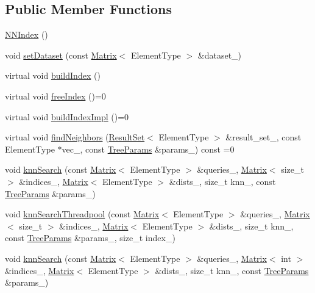 \subsection*{Public Member Functions}
\begin{DoxyCompactItemize}
\item 
\hyperlink{classtrees_1_1_n_n_index_ae314d8a7c8c0db0eaf22b667b4b4a14e}{N\+N\+Index} ()
\item 
void \hyperlink{classtrees_1_1_n_n_index_a0f02fa0888a3c93b38465ccd37517ba1}{set\+Dataset} (const \hyperlink{classtrees_1_1_matrix}{Matrix}$<$ Element\+Type $>$ \&dataset\+\_\+)
\item 
virtual void \hyperlink{classtrees_1_1_n_n_index_ad8db1182322eba8c1f68ce250e45a36c}{build\+Index} ()
\item 
virtual void \hyperlink{classtrees_1_1_n_n_index_afc6b99a8f2693e8b446fc6697dac9f0d}{free\+Index} ()=0
\item 
virtual void \hyperlink{classtrees_1_1_n_n_index_a3a280e25b04449f34c4ed0fcc419e7b1}{build\+Index\+Impl} ()=0
\item 
virtual void \hyperlink{classtrees_1_1_n_n_index_af48da46453e78744d8874c529e06b5ff}{find\+Neighbors} (\hyperlink{classtrees_1_1_result_set}{Result\+Set}$<$ Element\+Type $>$ \&result\+\_\+set\+\_\+, const Element\+Type $\ast$vec\+\_\+, const \hyperlink{structtrees_1_1_tree_params}{Tree\+Params} \&params\+\_\+) const =0
\item 
void \hyperlink{classtrees_1_1_n_n_index_abf4572754ebd83300ab7c7747be10752}{knn\+Search} (const \hyperlink{classtrees_1_1_matrix}{Matrix}$<$ Element\+Type $>$ \&queries\+\_\+, \hyperlink{classtrees_1_1_matrix}{Matrix}$<$ size\+\_\+t $>$ \&indices\+\_\+, \hyperlink{classtrees_1_1_matrix}{Matrix}$<$ Element\+Type $>$ \&dists\+\_\+, size\+\_\+t knn\+\_\+, const \hyperlink{structtrees_1_1_tree_params}{Tree\+Params} \&params\+\_\+)
\item 
void \hyperlink{classtrees_1_1_n_n_index_a059a92d41b77db12a7803e8348ae1c11}{knn\+Search\+Threadpool} (const \hyperlink{classtrees_1_1_matrix}{Matrix}$<$ Element\+Type $>$ \&queries\+\_\+, \hyperlink{classtrees_1_1_matrix}{Matrix}$<$ size\+\_\+t $>$ \&indices\+\_\+, \hyperlink{classtrees_1_1_matrix}{Matrix}$<$ Element\+Type $>$ \&dists\+\_\+, size\+\_\+t knn\+\_\+, const \hyperlink{structtrees_1_1_tree_params}{Tree\+Params} \&params\+\_\+, size\+\_\+t index\+\_\+)
\item 
void \hyperlink{classtrees_1_1_n_n_index_a4f489d7dd35c009a8e1e246dc569f8a0}{knn\+Search} (const \hyperlink{classtrees_1_1_matrix}{Matrix}$<$ Element\+Type $>$ \&queries\+\_\+, \hyperlink{classtrees_1_1_matrix}{Matrix}$<$ int $>$ \&indices\+\_\+, \hyperlink{classtrees_1_1_matrix}{Matrix}$<$ Element\+Type $>$ \&dists\+\_\+, size\+\_\+t knn\+\_\+, const \hyperlink{structtrees_1_1_tree_params}{Tree\+Params} \&params\+\_\+)
\end{DoxyCompactItemize}
